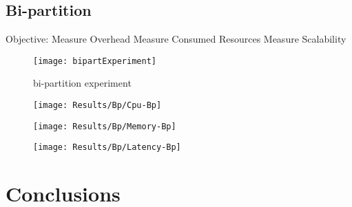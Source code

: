 \newpage



\subsection{Bi-partition} %
\label{sec:bi-partition}

Objective:
Measure Overhead
Measure Consumed Resources
Measure Scalability

\begin{figure}[htbp]
    \centering
    \texttt{[image: bipartExperiment]}
    \caption{bi-partition experiment}
    \label{fig:gantt}
\end{figure}

\begin{figure}[htbp]
    \centering
    \texttt{[image: Results/Bp/Cpu-Bp]}
    \label{fig:gantt}
\end{figure}

\begin{figure}[htbp]
    \centering
    \texttt{[image: Results/Bp/Memory-Bp]}
    \label{fig:gantt}
\end{figure}

\begin{figure}[htbp]
    \centering
    \texttt{[image: Results/Bp/Latency-Bp]}
    \label{fig:gantt}
\end{figure}

\section{Conclusions} %
\label{sec:conclusions}